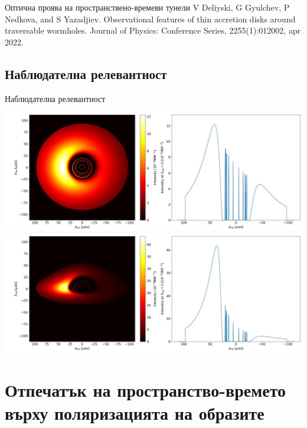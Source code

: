\documentclass[hyperref={colorlinks,citecolor=blue,linkcolor=blue,urlcolor=blue}]{beamer}
\begin{document}
\begin{frame}{Оптична проява на пространствено-времеви тунели}
		\tiny V Deliyski, G Gyulchev, P Nedkova, and S Yazadjiev. Observational features
		of thin accretion disks around traversable wormholes. Journal of Physics:
		Conference Series, 2255(1):012002, apr 2022.
		
		
	\end{frame}
	
	\subsection{Наблюдателна релевантност}
	
	\begin{frame}{Наблюдателна релевантност}

		\centering
		\includegraphics[scale = 0.3]{Pre-Defence/WH_20_deg.jpg}
		\includegraphics[scale = 0.3]{Pre-Defence/WH_70_deg.jpg}

		
	\end{frame}
	
	\section{Отпечатък на пространство-времето върху поляризацията на образите}
	
\end{document}
